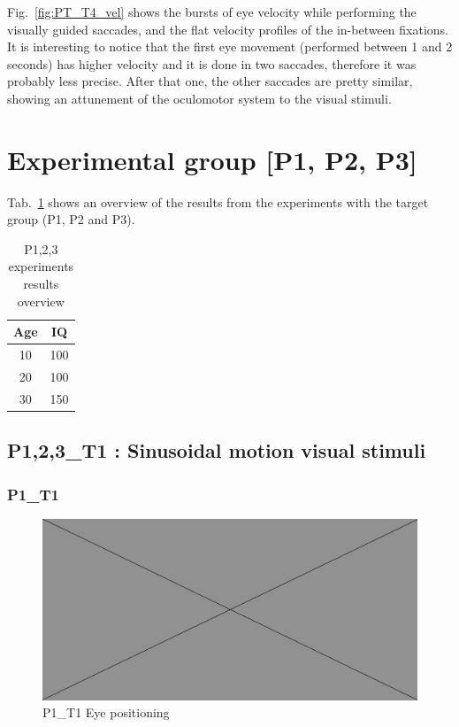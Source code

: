Fig.~\ref{fig:PT_T4_vel} shows the bursts of eye velocity while performing the visually guided saccades, and the flat velocity profiles of the in-between fixations. It is interesting to notice that the first eye movement (performed between 1 and 2 seconds) has higher velocity and it is done in two saccades, therefore it was probably less precise. After that one, the other saccades are pretty similar, showing an attunement of the oculomotor system to the visual stimuli.





\section{Experimental group [P1, P2, P3]}
\label{sec:resexpgroup}

Tab.~\ref{tab:expgroupresultssummary} shows an overview of the results from the experiments with the target group (P1, P2 and P3).

\begin{table}[h]
  \centering
  \begin{tabular}{c|c}
    Age  & IQ  \\ 
    \hline
    10   & 100 \\
    20   & 100 \\
    30   & 150
  \end{tabular}
  \caption{P{1,2,3} experiments results overview}
  \label{tab:expgroupresultssummary}
\end{table}



\subsection{P{1,2,3}\_T1 : Sinusoidal motion visual stimuli}
\label{sec:P123_T1}

\subsubsection{P1\_T1}
\label{sec:P1_T1}

\begin{figure}[h]
  \centering
  \includegraphics[width=.5\textwidth]{figures/placeholderImg.jpg}
  \caption[P1\_T1 Eye positioning]{P1\_T1 Eye positioning}
  \label{fig:P1_T1_pos}
\end{figure}

